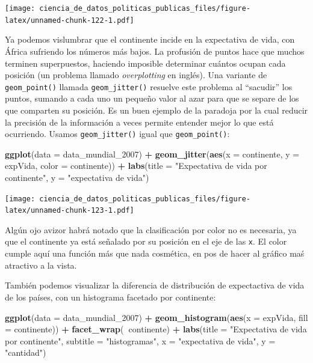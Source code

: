 \documentclass[]{book}
\newenvironment{Shaded}{\begin{snugshade}}{\end{snugshade}}
\newcommand{\KeywordTok}[1]{\textcolor[rgb]{0.13,0.29,0.53}{\textbf{#1}}}
\newcommand{\DataTypeTok}[1]{\textcolor[rgb]{0.13,0.29,0.53}{#1}}
\newcommand{\DecValTok}[1]{\textcolor[rgb]{0.00,0.00,0.81}{#1}}
\newcommand{\StringTok}[1]{\textcolor[rgb]{0.31,0.60,0.02}{#1}}
\newcommand{\OperatorTok}[1]{\textcolor[rgb]{0.81,0.36,0.00}{\textbf{#1}}}
\newcommand{\NormalTok}[1]{#1}
\begin{document}
\texttt{[image: ciencia\_de\_datos\_politicas\_publicas\_files/figure-latex/unnamed-chunk-122-1.pdf]}

Ya podemos vislumbrar que el continente incide en la expectativa de
vida, con África sufriendo los números más bajos. La profusión de puntos
hace que muchos terminen superpuestos, haciendo imposible determinar
cuántos ocupan cada posición (un problema llamado \emph{overplotting} en
inglés). Una variante de \texttt{geom\_point()} llamada
\texttt{geom\_jitter()} resuelve este problema al ``sacudir'' los
puntos, sumando a cada uno un pequeño valor al azar para que se separe
de los que comparten su posición. Es un buen ejemplo de la paradoja por
la cual reducir la precisión de la información a veces permite entender
mejor lo que está ocurriendo. Usamos \texttt{geom\_jitter()} igual que
\texttt{geom\_point()}:

\begin{Shaded}
\begin{Highlighting}[]
\KeywordTok{ggplot}\NormalTok{(}\DataTypeTok{data =}\NormalTok{ data_mundial_}\DecValTok{2007}\NormalTok{) }\OperatorTok{+}
\StringTok{    }\KeywordTok{geom_jitter}\NormalTok{(}\KeywordTok{aes}\NormalTok{(}\DataTypeTok{x =}\NormalTok{ continente, }\DataTypeTok{y =}\NormalTok{ expVida, }\DataTypeTok{color =}\NormalTok{ continente)) }\OperatorTok{+}
\StringTok{    }\KeywordTok{labs}\NormalTok{(}\DataTypeTok{title =} \StringTok{"Expectativa de vida por continente"}\NormalTok{,}
         \DataTypeTok{y =} \StringTok{"expectativa de vida"}\NormalTok{)}
\end{Highlighting}
\end{Shaded}

\texttt{[image: ciencia\_de\_datos\_politicas\_publicas\_files/figure-latex/unnamed-chunk-123-1.pdf]}

Algún ojo avizor habrá notado que la clasificación por color no es
necesaria, ya que el continente ya está señalado por su posición en el
eje de las \texttt{x}. El color cumple aquí una función más que nada
cosmética, en pos de hacer al gráfico maś atractivo a la vista.

También podemos visualizar la diferencia de distribución de expectactiva
de vida de los países, con un histograma facetado por continente:

\begin{Shaded}
\begin{Highlighting}[]
\KeywordTok{ggplot}\NormalTok{(}\DataTypeTok{data =}\NormalTok{ data_mundial_}\DecValTok{2007}\NormalTok{) }\OperatorTok{+}
\StringTok{    }\KeywordTok{geom_histogram}\NormalTok{(}\KeywordTok{aes}\NormalTok{(}\DataTypeTok{x =}\NormalTok{ expVida, }\DataTypeTok{fill =}\NormalTok{ continente)) }\OperatorTok{+}
\StringTok{    }\KeywordTok{facet_wrap}\NormalTok{(}\OperatorTok{~}\NormalTok{continente) }\OperatorTok{+}
\StringTok{    }\KeywordTok{labs}\NormalTok{(}\DataTypeTok{title =} \StringTok{"Expectativa de vida por continente"}\NormalTok{,}
         \DataTypeTok{subtitle =} \StringTok{"histogramas"}\NormalTok{,}
        \DataTypeTok{x =} \StringTok{"expectativa de vida"}\NormalTok{,}
        \DataTypeTok{y =} \StringTok{"cantidad"}\NormalTok{)}
\end{Highlighting}
\end{Shaded}
\end{document}

